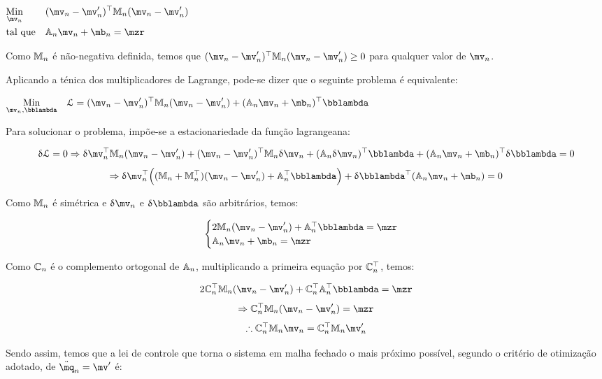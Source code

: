 \begin{center}
$\begin{aligned}
& \underset{\mv_n}{\text{Min}}
& & (\mv_n - \mv'_n)^\top \mM_n (\mv_n - \mv'_n) \\
& \text{tal que}
& & \mA_n \mv_n + \mb_n = \mzr
\end{aligned}$
\end{center}

Como $\mathbb{M}_n$ \'e n\~ao-negativa definida, temos que $(\mv_n - \mv'_n)^\top \mM_n (\mv_n - \mv'_n) \geq 0 $ para qualquer valor de $\mv_n$.

Aplicando a t\'enica dos multiplicadores de Lagrange, pode-se dizer que o seguinte problema é equivalente:

\begin{center}
$\begin{aligned}
& \underset{\mv_n, \mlambda}{\text{Min}}
& & \llL = (\mv_n - \mv'_n)^\top \mM_n (\mv_n - \mv'_n) + (\mA_n \mv_n + \mb_n)^\top \mlambda \\
\end{aligned}$
\end{center}

Para solucionar o problema, imp\~oe-se a estacionariedade da fun\c{c}\~ao lagrangeana:

$$ \dl \llL = 0 \Rightarrow \dl \mv_n^\top \mM_n (\mv_n - \mv'_n) + (\mv_n - \mv'_n)^\top \mM_n \dl \mv_n + (\mA_n \dl \mv_n)^\top \mlambda + (\mA_n \mv_n + \mb_n)^\top \dl \mlambda = 0 $$
$$ \Rightarrow \dl \mv_n^\top \Big( (\mM_n + \mM_n^\top)(\mv_n - \mv'_n) + \mA_n^\top \mlambda \Big) + \dl \mlambda^\top (\mA_n \mv_n + \mb_n) = 0 $$

Como $\mathbb{M}_n$ é sim\'etrica e $\dl \mv_n$ e $\dl \mlambda$ são arbitr\'arios, temos:

$$
\begin{cases}
2 \mM_n (\mv_n - \mv'_n) + \mA_n^\top \mlambda = \mzr \\
\mA_n \mv_n + \mb_n = \mzr
\end{cases}
$$

Como $\mathbb{C}_n$ é o complemento ortogonal de $\mathbb{A}_n$, multiplicando a primeira equa\c{c}\~ao por $\mathbb{C}_n^\top$, temos:

$$ 2 \mC_n^\top \mM_n (\mv_n - \mv'_n) + \mC_n^\top \mA_n^\top \mlambda = \mzr $$
$$ \Rightarrow  \mC_n^\top \mM_n (\mv_n - \mv'_n)  = \mzr $$
$$ \therefore \mC_n^\top \mM_n \mv_n  = \mC_n^\top \mM_n  \mv'_n $$

Sendo assim, temos que a lei de controle que torna o sistema em malha fechado o mais pr\'oximo poss\'ivel, segundo o crit\'erio de otimiza\c{c}\~ao adotado, de $\ddot{\mq}_n = \mv'$ \'e:

